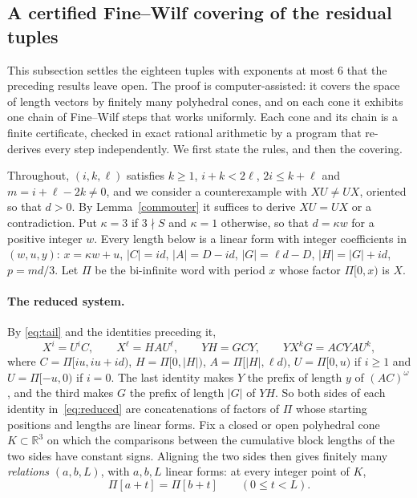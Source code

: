 \subsection{A certified Fine--Wilf covering of the residual tuples}\label{tail:cert-sec}

This subsection settles the eighteen tuples with exponents at most \(6\) that the preceding results leave open. The proof is computer-assisted: it covers the space of length vectors by finitely many polyhedral cones, and on each cone it exhibits one chain of Fine--Wilf steps that works uniformly. Each cone and its chain is a finite certificate, checked in exact rational arithmetic by a program that re-derives every step independently. We first state the rules, and then the covering.

Throughout, \((i,k,\ell)\) satisfies \(k\ge1\), \(i+k<2\ell\), \(2i\le k+\ell\) and \(m=i+\ell-2k\ne0\), and we consider a counterexample with \(XU\ne UX\), oriented so that \(d>0\). By Lemma~\ref{commouter} it suffices to derive \(XU=UX\) or a contradiction. Put \(\kappa=3\) if \(3\nmid S\) and \(\kappa=1\) otherwise, so that \(d=\kappa w\) for a positive integer \(w\). Every length below is a linear form with integer coefficients in \((w,u,y)\): \(x=\kappa w+u\), \(|C|=id\), \(|A|=D-id\), \(|G|=\ell d-D\), \(|H|=|G|+id\), \(p=md/3\). Let \(\Pi\) be the bi-infinite word with period \(x\) whose factor \(\Pi[0,x)\) is \(X\).

\paragraph{The reduced system.} By \eqref{eq:tail} and the identities preceding it,
\begin{equation}\label{eq:reduced}
X^i=U^iC,\qquad X^\ell=HAU^\ell,\qquad YH=GCY,\qquad YX^kG=ACYAU^k,
\end{equation}
where \(C=\Pi[iu,iu+id)\), \(H=\Pi[0,|H|)\), \(A=\Pi[|H|,\ell d)\), \(U=\Pi[0,u)\) if \(i\ge1\) and \(U=\Pi[-u,0)\) if \(i=0\). The last identity makes \(Y\) the prefix of length \(y\) of \((AC)^\omega\), and the third makes \(G\) the prefix of length \(|G|\) of \(YH\). So both sides of each identity in~\eqref{eq:reduced} are concatenations of factors of \(\Pi\) whose starting positions and lengths are linear forms. Fix a closed or open polyhedral cone \(K\subset\mathbb R^3\) on which the comparisons between the cumulative block lengths of the two sides have constant signs. Aligning the two sides then gives finitely many \emph{relations} \((a,b,L)\), with \(a,b,L\) linear forms: at every integer point of \(K\),
\[
\Pi[a+t]=\Pi[b+t]\qquad(0\le t<L).
\]

